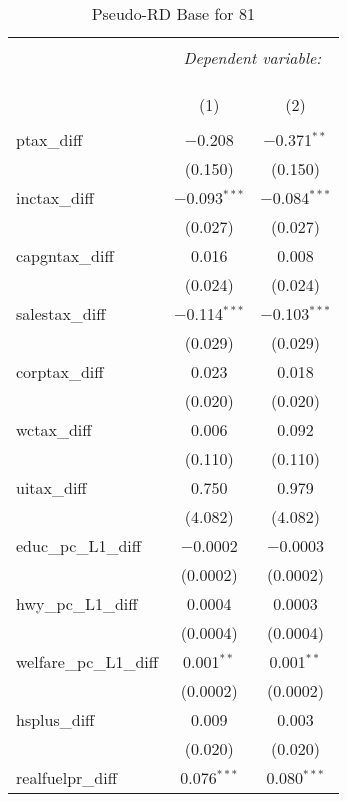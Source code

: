 
\begin{table}[!htbp] \centering 
  \caption{Pseudo-RD Base for  81} 
  \label{} 
\begin{tabular}{@{\extracolsep{5pt}}lcc} 
\\[-1.8ex]\hline 
\hline \\[-1.8ex] 
 & \multicolumn{2}{c}{\textit{Dependent variable:}} \\ 
\cline{2-3} 
\\[-1.8ex] & \multicolumn{2}{c}{ } \\ 
\\[-1.8ex] & (1) & (2)\\ 
\hline \\[-1.8ex] 
 ptax\_diff & $-$0.208 & $-$0.371$^{**}$ \\ 
  & (0.150) & (0.150) \\ 
  inctax\_diff & $-$0.093$^{***}$ & $-$0.084$^{***}$ \\ 
  & (0.027) & (0.027) \\ 
  capgntax\_diff & 0.016 & 0.008 \\ 
  & (0.024) & (0.024) \\ 
  salestax\_diff & $-$0.114$^{***}$ & $-$0.103$^{***}$ \\ 
  & (0.029) & (0.029) \\ 
  corptax\_diff & 0.023 & 0.018 \\ 
  & (0.020) & (0.020) \\ 
  wctax\_diff & 0.006 & 0.092 \\ 
  & (0.110) & (0.110) \\ 
  uitax\_diff & 0.750 & 0.979 \\ 
  & (4.082) & (4.082) \\ 
  educ\_pc\_L1\_diff & $-$0.0002 & $-$0.0003 \\ 
  & (0.0002) & (0.0002) \\ 
  hwy\_pc\_L1\_diff & 0.0004 & 0.0003 \\ 
  & (0.0004) & (0.0004) \\ 
  welfare\_pc\_L1\_diff & 0.001$^{**}$ & 0.001$^{**}$ \\ 
  & (0.0002) & (0.0002) \\ 
  hsplus\_diff & 0.009 & 0.003 \\ 
  & (0.020) & (0.020) \\ 
  realfuelpr\_diff & 0.076$^{***}$ & 0.080$^{***}$ \\ 

\end{tabular}
\end{table}

